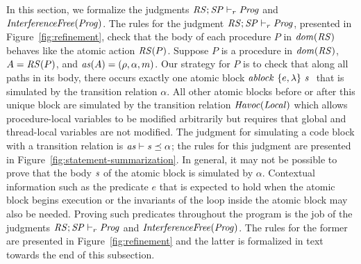 In this section, we formalize the judgments $\mathit{RS};\mathit{SP} \vdash_r \mathit{Prog}$ and $\mathit{InterferenceFree}(\mathit{Prog})$.
The rules for the judgment $\mathit{RS};\mathit{SP} \vdash_r \mathit{Prog}$, presented in Figure~\ref{fig:refinement}, check that the body of 
each procedure $P$ in $\mathit{dom}(\mathit{RS})$ behaves like the atomic action $\mathit{RS}(P)$.  
Suppose $P$ is a procedure in $\mathit{dom}(\mathit{RS})$, $A = \mathit{RS}(P)$, and $\mathit{as}(A) = (\rho, \alpha, m)$.
Our strategy for $P$ is to check that along all paths in its body, there occurs exactly one atomic block 
$\mathit{ablock}\ {\{e,\lambda\}}\ {\mathit{s}}\ $ that is simulated by the transition relation $\alpha$.
All other atomic blocks before or after this unique block are simulated by the transition relation $\mathit{Havoc}(\mathit{Local})$ 
which allows procedure-local variables to be modified arbitrarily but requires that global and thread-local variables are not modified.
The judgment for simulating a code block with a transition relation is $\mathit{as} \vdash \mathit{s} \preceq \alpha$; the rules for this judgment 
are presented in Figure~\ref{fig:statement-summarization}.
In general, it may not be possible to prove that the body $\mathit{s}$ of the atomic block is simulated by $\alpha$.
Contextual information such as the predicate $e$ that is expected to hold when the atomic block begins execution or the invariants
of the loop inside the atomic block may also be needed.
Proving such predicates throughout the program is the job of the judgments $\mathit{RS};\mathit{SP} \vdash_r \mathit{Prog}$ and $\mathit{InterferenceFree}(\mathit{Prog})$.
The rules for the former are presented in Figure~\ref{fig:refinement} and the latter is formalized in text towards the end of this 
subsection.

